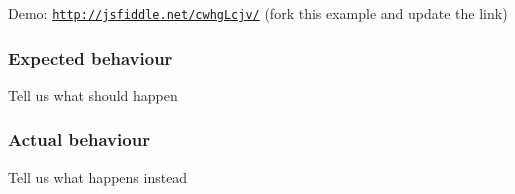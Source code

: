 
\begin{DoxyEnumerate}
\item 
\item 
\item 
\end{DoxyEnumerate}

Demo\+: \href{http://jsfiddle.net/cwhgLcjv/}{\tt http\+://jsfiddle.\+net/cwhg\+Lcjv/} (fork this example and update the link)

\subsubsection*{Expected behaviour}

Tell us what should happen

\subsubsection*{Actual behaviour}

Tell us what happens instead 